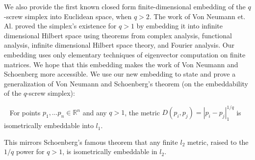 We also provide the first known closed form finite-dimensional embedding of
the $q$-screw simplex into Euclidean space, when $q>2$. The work of Von
Neumann et. Al. proved the simplex's existence for $q>1$ by embedding it
into infinite dimensional Hilbert space using theorems from complex
analysis, functional analysis, infinite dimensional Hilbert space theory,
and Fourier analysis. Our embedding uses only elementary techniques of
eigenvector computation on finite matrices. We hope that this embedding
makes the work of Von Neumann and Schoenberg more accessible. We use our
new embedding to state and prove a generalization of Von Neumann and
Schoenberg’s theorem (on the embeddability of the $q$-screw simplex):

\begin{theorem}~\label{thm:l1} For points $p_1, \ldots p_n \in
\mathbb{R}^n$ and any $q > 1$, the metric $D(p_i, p_j) = |p_i-p_j|_1^{1/q}$
is isometrically embeddable into $l_1$.\end{theorem}
This mirrors
Schoenberg's famous theorem that any finite $l_2$ metric, raised to the
$1/q$ power for $q > 1$, is isometrically embeddable in $l_2$.
